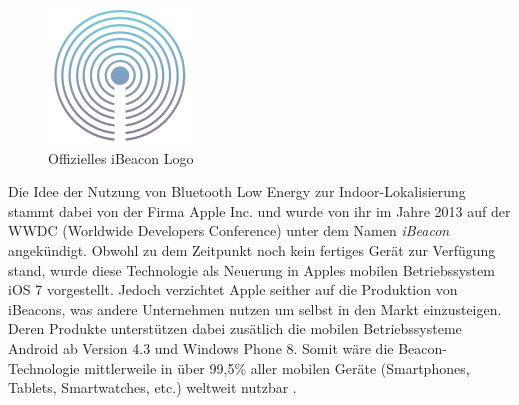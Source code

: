 \begin{figure}
\centering
\includegraphics[scale=0.5]{Bilder/iBeaconLogo.png} 
\caption{Offizielles iBeacon Logo \cite{iLogo}}
\label{iLogo}
\end{figure} Die Idee der Nutzung von Bluetooth Low Energy zur Indoor-Lokalisierung stammt dabei von der Firma Apple Inc. und wurde von ihr im Jahre 2013 auf der WWDC (Worldwide Developers Conference)\cite{Apple} unter dem Namen \textit{iBeacon} angekündigt. Obwohl zu dem Zeitpunkt noch kein fertiges Gerät zur Verfügung stand, wurde diese Technologie als Neuerung in Apples mobilen Betriebssystem iOS 7 vorgestellt. Jedoch verzichtet Apple seither auf die Produktion von iBeacons, was andere Unternehmen nutzen um selbst in den Markt einzusteigen. Deren Produkte unterstützen dabei zusätlich die mobilen Betriebssysteme Android ab Version 4.3 und Windows Phone 8. Somit wäre die Beacon-Technologie mittlerweile in über 99,5\% aller mobilen Geräte (Smartphones, Tablets, Smartwatches, etc.) weltweit nutzbar \cite{MobGerSt}.

